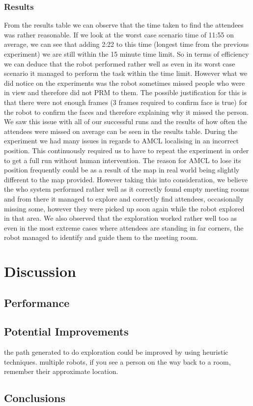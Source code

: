 \documentclass[conference]{IEEEtran}
\begin{document}
\subsubsection{Results}
From the results table we can observe that the time taken to find the attendees was rather reasonable. If we look at the worst case scenario time of 11:55 on average, we can see that adding 2:22 to this time (longest time from the previous experiment) we are still within the 15 minute time limit. So in terms of efficiency we can deduce that the robot performed rather well as even in its worst case scenario it managed to perform the task within the time limit. However what we did notice on the experiments was the robot sometimes missed people who were in view and therefore did not PRM to them. The possible justification for this is that there were not enough frames (3 frames required to confirm face is true) for the robot to confirm the faces and therefore explaining why it missed the person. We saw this issue with all of our successful runs and the results of how often the attendees were missed on average can be seen in the results table. During the experiment we had many issues in regards to AMCL localising in an incorrect position. This continuously required us to have to repeat the experiment in order to get a full run without human intervention. The reason for AMCL to lose its position frequently could be as a result of the map in real world being slightly different to the map provided. However taking this into consideration, we believe the who system performed rather well as it correctly found empty meeting rooms and from there it managed to explore and correctly find attendees, occasionally missing some, however they were picked up soon again while the robot explored in that area. We also observed that the exploration worked rather well too as even in the most extreme cases where attendees are standing in far corners, the robot managed to identify and guide them to the meeting room.

\section{Discussion}
\subsection{Performance}
\subsection{Potential Improvements}
the path generated to do exploration could be improved by using heuristic techniques. multiple robots, if you see a person on the way back to a room, remember their approximate location.
\subsection{Conclusions}


\end{document}
